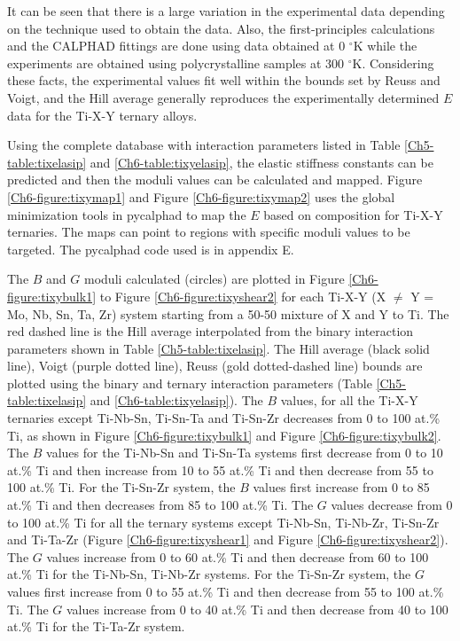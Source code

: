 It can be seen that there is a large variation in the experimental data depending on the technique used to obtain the data. Also, the first-principles calculations and the CALPHAD fittings are done using data obtained at 0 $^{\circ}$K while the experiments are obtained using polycrystalline samples at 300 $^{\circ}$K. Considering these facts, the experimental values fit well within the bounds set by Reuss and Voigt, and the Hill average generally reproduces the experimentally determined $E$ data for the Ti-X-Y ternary alloys. 

Using the complete database with interaction parameters listed in Table \ref{Ch5-table:tixelasip} and \ref{Ch6-table:tixyelasip}, the elastic stiffness constants can be predicted and then the moduli values can be calculated and mapped. Figure \ref{Ch6-figure:tixymap1} and Figure \ref{Ch6-figure:tixymap2} uses the global minimization tools in pycalphad \cite{Otis2017} to map the $E$ based on composition for Ti-X-Y ternaries. The maps can point to regions with specific moduli values to be targeted. The pycalphad code used is in appendix E.

The $B$ and $G$ moduli calculated (circles) are plotted in Figure \ref{Ch6-figure:tixybulk1} to Figure \ref{Ch6-figure:tixyshear2} for each Ti-X-Y (X $\neq$ Y = Mo, Nb, Sn, Ta, Zr) system starting from a 50-50 mixture of X and Y to Ti. The red dashed line is the Hill average interpolated from the binary interaction parameters shown in Table \ref{Ch5-table:tixelasip}. The Hill average (black solid line), Voigt (purple dotted line), Reuss (gold dotted-dashed line) bounds are plotted using the binary and ternary interaction parameters (Table \ref{Ch5-table:tixelasip} and \ref{Ch6-table:tixyelasip}). The $B$ values, for all the Ti-X-Y ternaries except Ti-Nb-Sn, Ti-Sn-Ta and Ti-Sn-Zr decreases from 0 to 100 at.\% Ti, as shown in Figure \ref{Ch6-figure:tixybulk1} and Figure \ref{Ch6-figure:tixybulk2}. The $B$ values for the Ti-Nb-Sn and Ti-Sn-Ta systems first decrease from 0 to 10 at.\% Ti and then increase from 10 to 55 at.\% Ti and then decrease from 55 to 100 at.\% Ti. For the Ti-Sn-Zr system, the $B$ values first increase from 0 to 85 at.\% Ti and then decreases from 85 to 100 at.\% Ti. The $G$ values decrease from 0 to 100 at.\% Ti for all the ternary systems except Ti-Nb-Sn, Ti-Nb-Zr, Ti-Sn-Zr and Ti-Ta-Zr (Figure \ref{Ch6-figure:tixyshear1} and Figure \ref{Ch6-figure:tixyshear2}). The $G$ values increase from 0 to 60 at.\% Ti and then decrease from 60 to 100 at.\% Ti for the Ti-Nb-Sn, Ti-Nb-Zr systems. For the Ti-Sn-Zr system, the $G$ values first increase from 0 to 55 at.\% Ti and then decrease from 55 to 100 at.\% Ti. The $G$ values increase from 0 to 40 at.\% Ti and then decrease from 40 to 100 at.\% Ti for the Ti-Ta-Zr system. 

